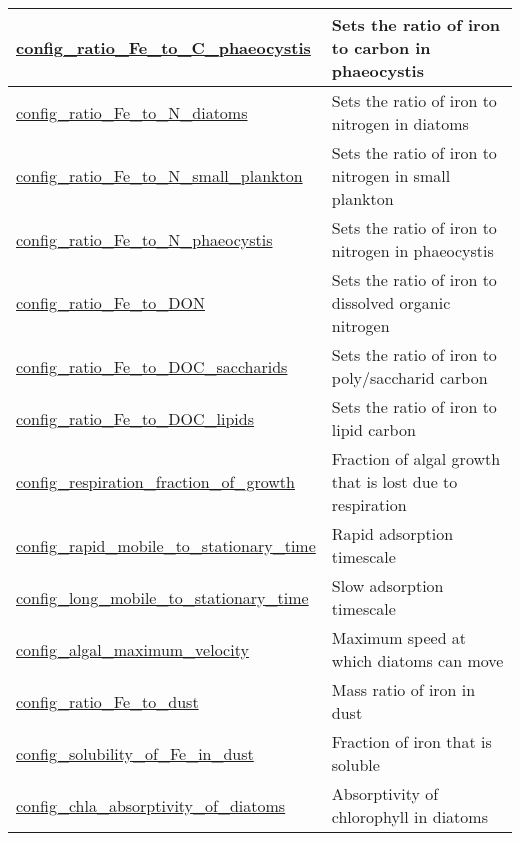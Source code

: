 {\begin{center}
\begin{longtable}{| p{2.0in} || p{4.0in} |}
    \hline
    \hyperref[subsec:nm_sec_config_ratio_Fe_to_C_phaeocystis]{config\_ratio\_Fe\_to\_C\_\-phaeocystis} & Sets the ratio of iron to carbon in phaeocystis \\
    \hline
    \hyperref[subsec:nm_sec_config_ratio_Fe_to_N_diatoms]{config\_ratio\_Fe\_to\_N\_diatoms} & Sets the ratio of iron to nitrogen in diatoms \\
    \hline
    \hyperref[subsec:nm_sec_config_ratio_Fe_to_N_small_plankton]{config\_ratio\_Fe\_to\_N\_small\_\-plankton} & Sets the ratio of iron to nitrogen in small plankton \\
    \hline
    \hyperref[subsec:nm_sec_config_ratio_Fe_to_N_phaeocystis]{config\_ratio\_Fe\_to\_N\_\-phaeocystis} & Sets the ratio of iron to nitrogen in phaeocystis \\
    \hline
    \hyperref[subsec:nm_sec_config_ratio_Fe_to_DON]{config\_ratio\_Fe\_to\_DON} & Sets the ratio of iron to dissolved organic nitrogen \\
    \hline
    \hyperref[subsec:nm_sec_config_ratio_Fe_to_DOC_saccharids]{config\_ratio\_Fe\_to\_DOC\_\-saccharids} & Sets the ratio of iron to poly/saccharid carbon \\
    \hline
    \hyperref[subsec:nm_sec_config_ratio_Fe_to_DOC_lipids]{config\_ratio\_Fe\_to\_DOC\_\-lipids} & Sets the ratio of iron to lipid carbon \\
    \hline
    \hyperref[subsec:nm_sec_config_respiration_fraction_of_growth]{config\_respiration\_fraction\_of\_\-growth} & Fraction of algal growth that is lost due to respiration \\
    \hline
    \hyperref[subsec:nm_sec_config_rapid_mobile_to_stationary_time]{config\_rapid\_mobile\_to\_\-stationary\_time} & Rapid adsorption timescale   \\
    \hline
    \hyperref[subsec:nm_sec_config_long_mobile_to_stationary_time]{config\_long\_mobile\_to\_\-stationary\_time} & Slow adsorption timescale \\
    \hline
    \hyperref[subsec:nm_sec_config_algal_maximum_velocity]{config\_algal\_maximum\_velocity} & Maximum speed at which diatoms can move \\
    \hline
    \hyperref[subsec:nm_sec_config_ratio_Fe_to_dust]{config\_ratio\_Fe\_to\_dust} & Mass ratio of iron in dust \\
    \hline
    \hyperref[subsec:nm_sec_config_solubility_of_Fe_in_dust]{config\_solubility\_of\_Fe\_in\_\-dust} & Fraction of iron that is soluble \\
    \hline
    \hyperref[subsec:nm_sec_config_chla_absorptivity_of_diatoms]{config\_chla\_absorptivity\_of\_\-diatoms} & Absorptivity of chlorophyll in diatoms \\

\end{longtable}
\end{center}}
